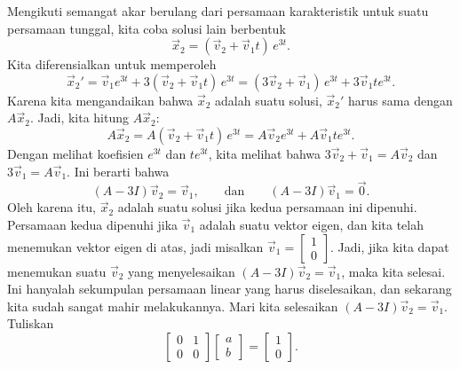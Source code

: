 \begin{example}
Mengikuti semangat akar berulang dari
persamaan karakteristik untuk suatu persamaan tunggal, kita coba solusi lain berbentuk
\begin{equation*}
\vec{x}_2 = ( \vec{v}_2 +  \vec{v}_1 t )\, e^{3t} .
\end{equation*}
Kita diferensialkan untuk memperoleh
\begin{equation*}
{\vec{x}_2}' =
\vec{v}_1 e^{3t} +
3 ( \vec{v}_2 +  \vec{v}_1 t )\, e^{3t}
=
( 3 \vec{v}_2 + \vec{v}_1 )\, e^{3t} +  3 \vec{v}_1 t e^{3t} .
\end{equation*}
Karena kita mengandaikan bahwa $\vec{x}_2$ adalah suatu solusi, ${\vec{x}_2}'$ harus
sama dengan $A \vec{x}_2$. Jadi, kita hitung $A \vec{x}_2$:
\begin{equation*}
A \vec{x}_2 = 
A ( \vec{v}_2 +  \vec{v}_1 t )\, e^{3t}
=
A \vec{v}_2 e^{3t} +  A \vec{v}_1 t e^{3t} .
\end{equation*}
Dengan melihat koefisien $e^{3t}$ dan $t e^{3t}$, kita melihat bahwa
$3 \vec{v}_2 + \vec{v}_1 = A \vec{v}_2$ dan
$3 \vec{v}_1 = A \vec{v}_1$.
Ini berarti bahwa
\begin{equation*}
(A-3I)\vec{v}_2 = \vec{v}_1,
\qquad \text{dan} \qquad
(A-3I)\vec{v}_1 = \vec{0}.
\end{equation*}
Oleh karena itu, $\vec{x}_2$ adalah suatu solusi
jika kedua persamaan ini dipenuhi.
Persamaan kedua dipenuhi jika $\vec{v}_1$ adalah suatu
vektor eigen, dan kita telah menemukan vektor eigen di atas, jadi misalkan
$\vec{v}_1 = 
\left[ \begin{smallmatrix} 1 \\ 0 \end{smallmatrix} \right]$.
Jadi, jika kita dapat menemukan suatu $\vec{v}_2$ yang menyelesaikan
$(A-3I)\vec{v}_2 = \vec{v}_1$, maka kita selesai.
Ini hanyalah sekumpulan persamaan linear
yang harus diselesaikan, dan sekarang kita sudah sangat mahir melakukannya.
%
Mari kita selesaikan
$(A-3I)\vec{v}_2 = \vec{v}_1$.  Tuliskan
\begin{equation*}
\begin{bmatrix}
0 & 1 \\ 0 & 0
\end{bmatrix}
\begin{bmatrix}
a \\ b
\end{bmatrix}
=
\begin{bmatrix}
1 \\ 0
\end{bmatrix} .

\end{equation*}
\end{example}

